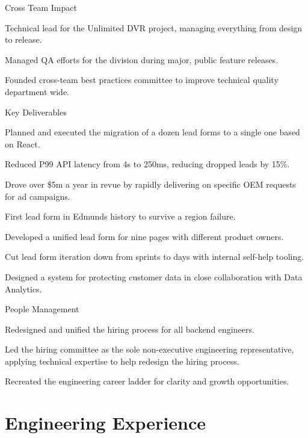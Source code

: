 \documentclass[]{deedy-resume-openfont}
\begin{document}
Cross Team Impact
\begin{tightemize}
\item Technical lead for the Unlimited DVR project, managing everything from design to release.
\item Managed QA efforts for the division during major, public feature releases.
\item Founded cross-team best practices committee to improve technical quality department wide.
\end{tightemize}
\sectionsep

\vspace{\topsep}
Key Deliverables
\begin{tightemize}
\item Planned and executed the migration of a dozen lead forms to a single one based on React.
\item Reduced P99 API latency from 4s to 250ms, reducing dropped leads by 15\%.
\item Drove over \$5m a year in revue by rapidly delivering on specific OEM requests for ad campaigns.
\item First lead form in Edmunds history to survive a region failure.
\item Developed a unified lead form for nine pages with different product owners.
\item Cut lead form iteration down from sprints to days with internal self-help tooling.
\item Designed a system for protecting customer data in close collaboration with Data Analytics.
\end{tightemize}
\sectionsep
People Management
\begin{tightemize}
  \item Redesigned and unified the hiring process for all backend engineers.
  \item Led the hiring committee as the sole non-executive engineering representative, applying technical expertise to help redesign the hiring process.
  \item Recreated the engineering career ladder for clarity and growth opportunities.
\end{tightemize}

\pagebreak

\section{Engineering Experience}
\end{document}
